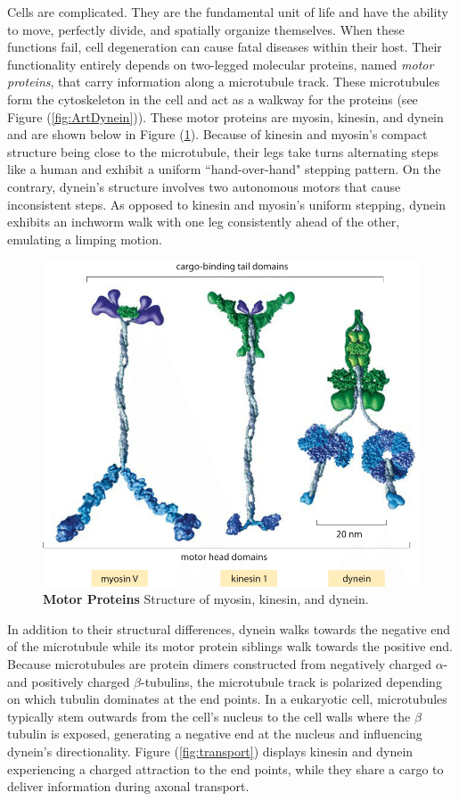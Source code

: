 Cells are complicated. They are the fundamental unit of life and have the ability to move, perfectly divide, and spatially organize themselves. When these functions fail, cell degeneration can cause fatal diseases within their host. Their functionality entirely depends on two-legged molecular proteins, named \textit{motor proteins}, that carry information along a microtubule track. These microtubules form the cytoskeleton in the cell and act as a walkway for the proteins (see Figure (\ref{fig:ArtDynein})). These motor proteins are myosin, kinesin, and dynein and are shown below in Figure (\ref{fig:Compare}). Because of kinesin and myosin's compact structure being close to the microtubule, their legs take turns alternating steps like a human and exhibit a uniform ``hand-over-hand" stepping pattern. On the contrary, dynein's structure involves two autonomous motors that cause inconsistent steps. As opposed to kinesin and myosin's uniform stepping, dynein exhibits an inchworm walk with one leg consistently ahead of the other, emulating a limping motion.

\begin{figure}[H]
	\centering
	\includegraphics[width=0.4\columnwidth]{Figures/motor_comparison.png}
	\caption[Motor Proteins]{\textbf{Motor Proteins} Structure of myosin, kinesin, and dynein. \cite{JohnsonArt}}
	\label{fig:Compare}
\end{figure}

In addition to their structural differences, dynein walks towards the negative end of the microtubule while its motor protein siblings walk towards the positive end. Because microtubules are protein dimers constructed from negatively charged $\alpha$- and positively charged $\beta$-tubulins, the microtubule track is polarized depending on which tubulin dominates at the end points. In a eukaryotic cell, microtubules typically stem outwards from the cell's nucleus to the cell walls where the $\beta$ tubulin is exposed, generating a negative end at the nucleus and influencing dynein's directionality. Figure (\ref{fig:transport}) displays kinesin and dynein experiencing a charged attraction to the end points, while they share a cargo to deliver information during axonal transport. 

